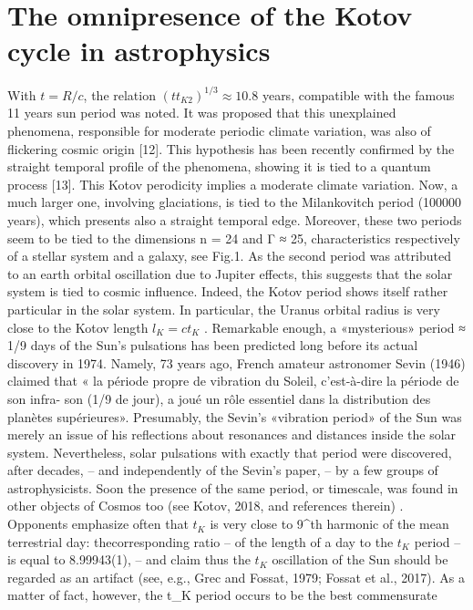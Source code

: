 \section {The omnipresence of the Kotov cycle in astrophysics}

With $t = R/c$, the relation $(t t_{K2} )^{1/3} \approx 10.8$ years, compatible with the famous 11 years sun period
was noted. It was proposed that this unexplained phenomena, responsible for moderate periodic
climate variation, was also of flickering cosmic origin [12]. This hypothesis has been recently
confirmed by the straight temporal profile of the phenomena, showing it is tied to a quantum
process [13].
This Kotov perodicity implies a moderate climate variation. Now, a much larger one, involving
glaciations, is tied to the Milankovitch period (100000 years), which presents also a straight
temporal edge. Moreover, these two periods seem to be tied to the dimensions n = 24 and Γ ≈ 25,
characteristics respectively of a stellar system and a galaxy, see Fig.1. As the second period was
attributed to an earth orbital oscillation due to Jupiter effects, this suggests that the solar system is
tied to cosmic influence. Indeed, the Kotov period shows itself rather particular in the solar system.
In particular, the Uranus orbital radius is very close to the Kotov length $l_{K} = ct_{K}$ .
Remarkable enough, a «mysterious» period ≈ 1/9 days of the Sun's pulsations has been predicted
long before its actual discovery in 1974. Namely, 73 years ago, French amateur astronomer Sevin
(1946) claimed that « la période propre de vibration du Soleil, c'est-à-dire la période de son infra-
son (1/9 de jour), a joué un rôle essentiel dans la distribution des planètes supérieures». Presumably,
the Sevin's «vibration period» of the Sun was merely an issue of his reflections about resonances
and distances inside the solar system. Nevertheless, solar pulsations with exactly that period were
discovered, after decades, – and independently of the Sevin's paper, – by a few groups of
astrophysicists. Soon the presence of the same period, or timescale, was found in other objects of
Cosmos too (see Kotov, 2018, and references therein) .
Opponents emphasize often that $t_{K}$ is very close to 9^{th} harmonic of the mean terrestrial day: thecorresponding ratio – of the length of a day to the $t_{K}$ period – is equal to 8.99943(1), – and claim
thus the $t_{K}$ oscillation of the Sun should be regarded as an artifact (see, e.g., Grec and Fossat, 1979;
Fossat et al., 2017). As a matter of fact, however, the t_K period occurs to be the best commensurate
